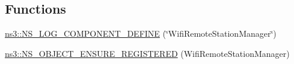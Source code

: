 \subsection*{Functions}
\begin{DoxyCompactItemize}
\item 
\hyperlink{namespacens3_a9e097cc7345ce3295f837892a91fadbf}{ns3\+::\+N\+S\+\_\+\+L\+O\+G\+\_\+\+C\+O\+M\+P\+O\+N\+E\+N\+T\+\_\+\+D\+E\+F\+I\+NE} (\char`\"{}Wifi\+Remote\+Station\+Manager\char`\"{})
\item 
\hyperlink{namespacens3_acd16622b6a3c0a5ac0fca41668fec0b1}{ns3\+::\+N\+S\+\_\+\+O\+B\+J\+E\+C\+T\+\_\+\+E\+N\+S\+U\+R\+E\+\_\+\+R\+E\+G\+I\+S\+T\+E\+R\+ED} (Wifi\+Remote\+Station\+Manager)
\end{DoxyCompactItemize}
